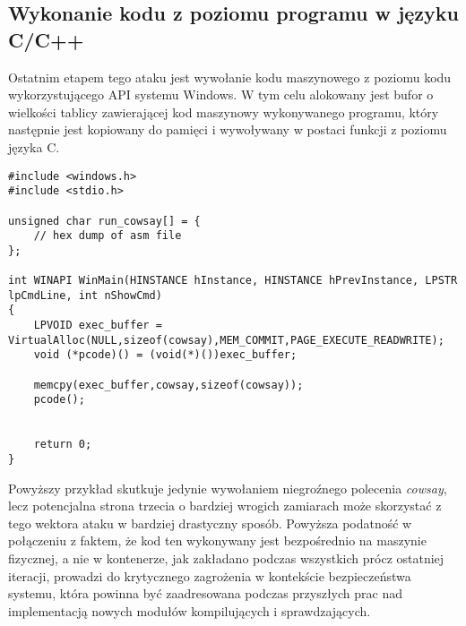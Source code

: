 \subsection{Wykonanie kodu z poziomu programu w języku C/C++}
Ostatnim etapem tego ataku jest wywołanie kodu maszynowego z poziomu kodu wykorzystującego API systemu Windows. W tym celu alokowany jest bufor o wielkości tablicy zawierającej kod maszynowy wykonywanego programu, który następnie jest kopiowany do pamięci i wywoływany w postaci funkcji z poziomu języka C.
\lstset{style=cpp}
\begin{lstlisting}[caption = {Przykładowy program napisany w assemblerze na system Linux wywołujący program Cowsay}]
#include <windows.h>
#include <stdio.h>

unsigned char run_cowsay[] = {
    // hex dump of asm file
};

int WINAPI WinMain(HINSTANCE hInstance, HINSTANCE hPrevInstance, LPSTR lpCmdLine, int nShowCmd)
{
    LPVOID exec_buffer = VirtualAlloc(NULL,sizeof(cowsay),MEM_COMMIT,PAGE_EXECUTE_READWRITE);
    void (*pcode)() = (void(*)())exec_buffer;

    memcpy(exec_buffer,cowsay,sizeof(cowsay));
    pcode();


    return 0;
}
\end{lstlisting}
Powyższy przykład skutkuje jedynie wywołaniem niegroźnego polecenia \textit{cowsay}, lecz potencjalna strona trzecia o bardziej wrogich zamiarach może skorzystać z tego wektora ataku w bardziej drastyczny sposób. 
\newline \noindent Powyższa podatność w połączeniu z faktem, że kod ten wykonywany jest bezpośrednio na maszynie fizycznej, a nie w kontenerze, jak zakładano podczas wszystkich prócz ostatniej iteracji, prowadzi do krytycznego zagrożenia w kontekście bezpieczeństwa systemu, która powinna być zaadresowana podczas przyszłych prac nad implementacją nowych modułów kompilujących i sprawdzających.
